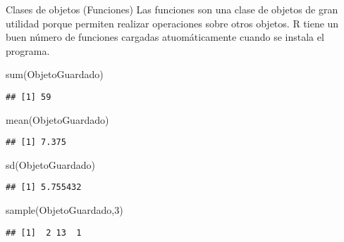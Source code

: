 \documentclass[
  10,
  ignorenonframetext,
]{beamer}
\newenvironment{Shaded}{\begin{snugshade}}{\end{snugshade}}
\newcommand{\DecValTok}[1]{\textcolor[rgb]{0.00,0.00,0.81}{#1}}
\newcommand{\FunctionTok}[1]{\textcolor[rgb]{0.00,0.00,0.00}{#1}}
\newcommand{\NormalTok}[1]{#1}
\begin{document}
\begin{frame}[fragile]{Clases de objetos (Funciones)}
\protect\hypertarget{clases-de-objetos-funciones}{}
Las funciones son una clase de objetos de gran utilidad porque permiten
realizar operaciones sobre otros objetos. R tiene un buen número de
funciones cargadas atuomáticamente cuando se instala el programa.

\begin{Shaded}
\begin{Highlighting}[]
\FunctionTok{sum}\NormalTok{(ObjetoGuardado)}
\end{Highlighting}
\end{Shaded}

\begin{verbatim}
## [1] 59
\end{verbatim}

\begin{Shaded}
\begin{Highlighting}[]
\FunctionTok{mean}\NormalTok{(ObjetoGuardado)}
\end{Highlighting}
\end{Shaded}

\begin{verbatim}
## [1] 7.375
\end{verbatim}

\begin{Shaded}
\begin{Highlighting}[]
\FunctionTok{sd}\NormalTok{(ObjetoGuardado)}
\end{Highlighting}
\end{Shaded}

\begin{verbatim}
## [1] 5.755432
\end{verbatim}

\begin{Shaded}
\begin{Highlighting}[]
\FunctionTok{sample}\NormalTok{(ObjetoGuardado,}\DecValTok{3}\NormalTok{)}
\end{Highlighting}
\end{Shaded}

\begin{verbatim}
## [1]  2 13  1
\end{verbatim}
\end{frame}
\end{document}
